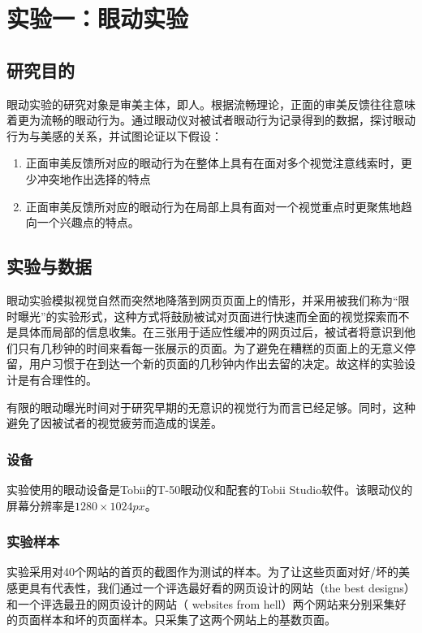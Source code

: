 \chapter{实验一：眼动实验}
\label{exp1}

\section{研究目的}
眼动实验的研究对象是审美主体，即人。根据流畅理论，正面的审美反馈往往意味着更为流畅的眼动行为。通过眼动仪对被试者眼动行为记录得到的数据，探讨眼动行为与美感的关系，并试图论证以下假设：

\begin{enumerate}
  \item 正面审美反馈所对应的眼动行为在整体上具有在面对多个视觉注意线索时，更少冲突地作出选择的特点
  \item 正面审美反馈所对应的眼动行为在局部上具有面对一个视觉重点时更聚焦地趋向一个兴趣点的特点。
\end{enumerate}

\section{实验与数据}
眼动实验模拟视觉自然而突然地降落到网页页面上的情形，并采用被我们称为“限时曝光”的实验形式，这种方式将鼓励被试对页面进行快速而全面的视觉探索而不是具体而局部的信息收集。在三张用于适应性缓冲的网页过后，被试者将意识到他们只有几秒钟的时间来看每一张展示的页面。为了避免在糟糕的页面上的无意义停留，用户习惯于在到达一个新的页面的几秒钟内作出去留的决定。故这样的实验设计是有合理性的。

有限的眼动曝光时间对于研究早期的无意识的视觉行为而言已经足够。同时，这种避免了因被试者的视觉疲劳而造成的误差。

\subsection{设备}
实验使用的眼动设备是Tobii的T-50眼动仪和配套的Tobii Studio软件。该眼动仪的屏幕分辨率是$1280\times1024px$。

\subsection{实验样本}
实验采用对40个网站的首页的截图作为测试的样本。为了让这些页面对好/坏的美感更具有代表性，我们通过一个评选最好看的网页设计的网站（the best designs\footnotemark[1]）和一个评选最丑的网页设计的网站（ websites from hell\footnotemark[2]）两个网站来分别采集好的页面样本和坏的页面样本。只采集了这两个网站上的基数页面。

